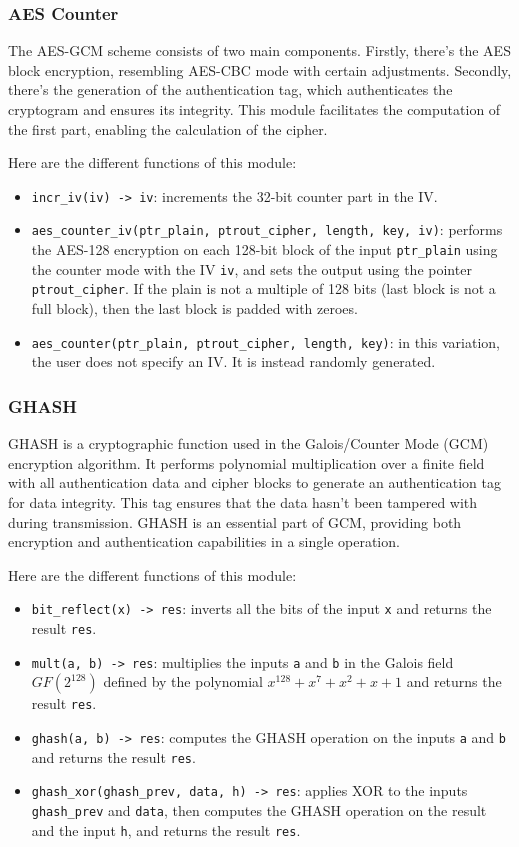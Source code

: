 \documentclass[runningheads]{llncs}
\begin{document}
\subsubsection{AES Counter}

The AES-GCM scheme consists of two main components. Firstly, there's the AES block encryption, resembling AES-CBC mode with certain adjustments. Secondly, there's the generation of the authentication tag, which authenticates the cryptogram and ensures its integrity. This module facilitates the computation of the first part, enabling the calculation of the cipher.


Here are the different functions of this module:
\begin{itemize}
    \item \texttt{incr\_iv(iv) -> iv}: increments the 32-bit counter part in the IV.
    \item \texttt{aes\_counter\_iv(ptr\_plain, ptrout\_cipher, length, key, iv)}: performs the AES-128 encryption on each 128-bit block of the input \texttt{ptr\_plain} using the counter mode with the IV \texttt{iv}, and sets the output using the pointer \texttt{ptrout\_cipher}. If the plain is not a multiple of 128 bits (last block is not a full block), then the last block is padded with zeroes.
    \item \texttt{aes\_counter(ptr\_plain, ptrout\_cipher, length, key)}: in this variation, the user does not specify an IV. It is instead randomly generated.
\end{itemize}

\subsubsection{GHASH}

GHASH is a cryptographic function used in the Galois/Counter Mode (GCM) encryption algorithm. It performs polynomial multiplication over a finite field with all authentication data and cipher blocks to generate an authentication tag for data integrity. This tag ensures that the data hasn't been tampered with during transmission. GHASH is an essential part of GCM, providing both encryption and authentication capabilities in a single operation.

Here are the different functions of this module:
\begin{itemize}
    \item \texttt{bit\_reflect(x) -> res}: inverts all the bits of the input \texttt{x} and returns the result \texttt{res}.
    \item \texttt{mult(a, b) -> res}: multiplies the inputs \texttt{a} and \texttt{b} in the Galois field $GF(2^{128})$ defined by the polynomial $x^{128} + x^7 + x^2 + x + 1$ and returns the result \texttt{res}.
    \item \texttt{ghash(a, b) -> res}: computes the GHASH operation on the inputs \texttt{a} and \texttt{b} and returns the result \texttt{res}.
    \item \texttt{ghash\_xor(ghash\_prev, data, h) -> res}: applies XOR to the inputs \texttt{ghash\_prev} and \texttt{data}, then computes the GHASH operation on the result and the input \texttt{h}, and returns the result \texttt{res}.
\end{itemize}
\end{document}
